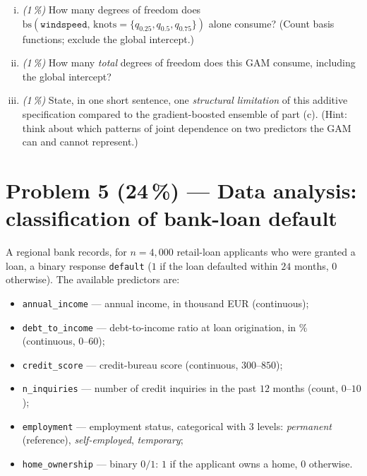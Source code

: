 \documentclass[11pt,a4paper]{article}
\newcommand{\points}[1]{\textbf{(#1\,\%)}}
\newcommand{\subpoints}[1]{\textit{(#1\,\%)}}
\begin{document}
\begin{enumerate}[(i)]
  \item \subpoints{1} How many degrees of freedom does $\mathrm{bs}(\texttt{windspeed},\, \mathrm{knots} = \{q_{0.25}, q_{0.5}, q_{0.75}\})$ alone consume? (Count basis functions; exclude the global intercept.)

  \item \subpoints{1} How many \emph{total} degrees of freedom does this GAM consume, including the global intercept?

  \item \subpoints{1} State, in one short sentence, one \emph{structural limitation} of this additive specification compared to the gradient-boosted ensemble of part (c). (Hint: think about which patterns of joint dependence on two predictors the GAM can and cannot represent.)
\end{enumerate}

\vfill\eject

\section*{Problem 5 \points{24} --- Data analysis: classification of bank-loan default}

A regional bank records, for $n = 4{,}000$ retail-loan applicants who were granted a loan, a binary response \texttt{default} ($1$ if the loan defaulted within $24$ months, $0$ otherwise). The available predictors are:

\begin{itemize}
  \item \texttt{annual\_income} --- annual income, in thousand EUR (continuous);
  \item \texttt{debt\_to\_income} --- debt-to-income ratio at loan origination, in $\%$ (continuous, $0$--$60$);
  \item \texttt{credit\_score} --- credit-bureau score (continuous, $300$--$850$);
  \item \texttt{n\_inquiries} --- number of credit inquiries in the past $12$ months (count, $0$--$10$);
  \item \texttt{employment} --- employment status, categorical with $3$ levels: \emph{permanent} (reference), \emph{self-employed}, \emph{temporary};
  \item \texttt{home\_ownership} --- binary $0/1$: $1$ if the applicant owns a home, $0$ otherwise.
\end{itemize}
\end{document}
